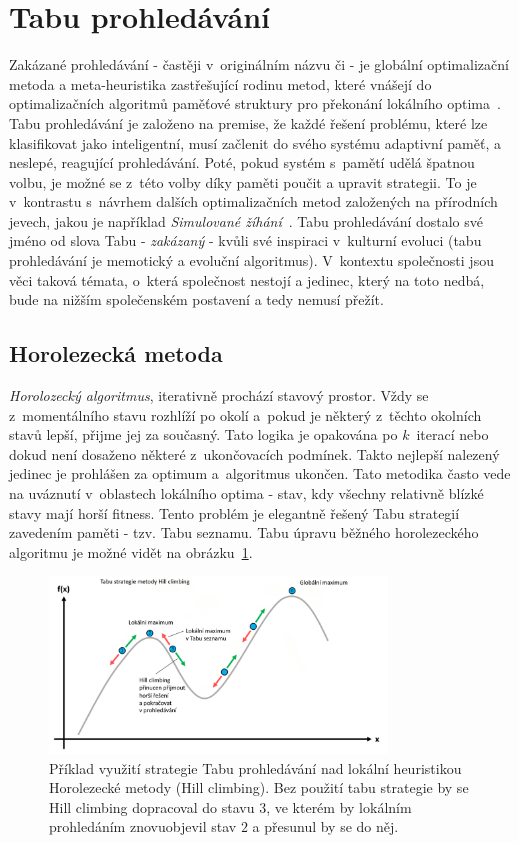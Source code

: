 \section{Tabu prohledávání} %
\label{algs:ta}
Zakázané prohledávání - častěji v~originálním názvu  či  - je globální optimalizační metoda a meta-heuristika zastřešující rodinu metod, které vnášejí do optimalizačních algoritmů paměťové struktury pro překonání lokálního optima~\cite{Glover2006}. Tabu prohledávání je založeno na premise, že každé řešení problému, které lze klasifikovat jako inteligentní, musí začlenit do svého systému adaptivní paměť, a neslepé, reagující prohledávání. Poté, pokud systém s~pamětí udělá špatnou volbu, je možné se z~této volby díky paměti poučit a upravit strategii. To je v~kontrastu s~návrhem dalších optimalizačních metod založených na přírodních jevech, jakou je například \textit{Simulované žíhání}~\cite{Glover2006}. Tabu prohledávání dostalo své jméno od slova Tabu - \textit{zakázaný} - kvůli své inspiraci v~kulturní evoluci (tabu prohledávání je memotický a evoluční algoritmus). V~kontextu společnosti jsou  věci taková témata, o~která společnost nestojí a jedinec, který na toto nedbá, bude na nižším společenském postavení a tedy nemusí přežít. 

\subsection{Horolezecká metoda}
\textit{Horolozecký algoritmus}, iterativně prochází stavový prostor. Vždy se z~momentálního stavu rozhlíží po okolí a~pokud je některý z~těchto okolních stavů lepší, přijme jej za současný. Tato logika je opakována po $k$~iterací nebo dokud není dosaženo některé z~ukončovacích podmínek. Takto nejlepší nalezený jedinec je prohlášen za optimum a~algoritmus ukončen. Tato metodika často vede na uváznutí v~oblastech lokálního optima - stav, kdy všechny relativně blízké stavy mají horší fitness. Tento problém je elegantně řešený Tabu strategií zavedením paměti - tzv. Tabu seznamu. Tabu úpravu běžného horolezeckého algoritmu je možné vidět na obrázku~\ref{fg:tabu}.

\begin{figure}[hbt]
	\centering
	\includegraphics[width=0.8\textwidth]{obrazky-figures/tabu.png}
	\caption{Příklad využití strategie Tabu prohledávání nad lokální heuristikou Horolezecké metody (Hill climbing). Bez použití tabu strategie by se Hill climbing dopracoval do stavu $3$, ve kterém by lokálním prohledáním znovuobjevil stav $2$ a přesunul by se do něj.}
	\label{fg:tabu}
\end{figure}

